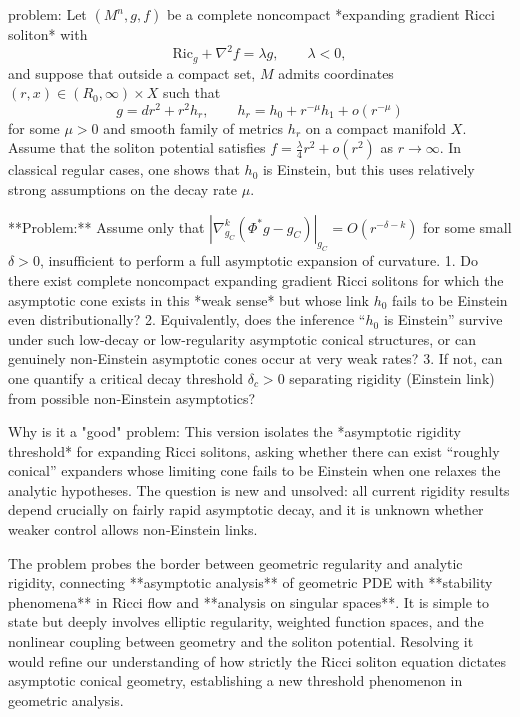 problem:  
Let \((M^n,g,f)\) be a complete noncompact *expanding gradient Ricci soliton* with  
\[
\mathrm{Ric}_g + \nabla^2 f = \lambda g, \qquad \lambda < 0,
\]
and suppose that outside a compact set, \(M\) admits coordinates \((r,x)\in (R_0,\infty)\times X\) such that  
\[
g = dr^2 + r^2 h_r, \qquad h_r = h_0 + r^{-\mu} h_1 + o(r^{-\mu})
\]
for some \(\mu>0\) and smooth family of metrics \(h_r\) on a compact manifold \(X\).  Assume that the soliton potential satisfies \(f = \tfrac{\lambda}{4}r^2 + o(r^2)\) as \(r\to\infty\).  In classical regular cases, one shows that \(h_0\) is Einstein, but this uses relatively strong assumptions on the decay rate \(\mu\).  

**Problem:**  
Assume only that \(|\nabla_{g_C}^k(\Phi^*g - g_C)|_{g_C} = O(r^{-\delta-k})\) for some small \(\delta>0\), insufficient to perform a full asymptotic expansion of curvature.  
1. Do there exist complete noncompact expanding gradient Ricci solitons for which the asymptotic cone exists in this *weak sense* but whose link \(h_0\) fails to be Einstein even distributionally?  
2. Equivalently, does the inference “\(h_0\) is Einstein” survive under such low-decay or low-regularity asymptotic conical structures, or can genuinely non‑Einstein asymptotic cones occur at very weak rates?  
3. If not, can one quantify a critical decay threshold \(\delta_c>0\) separating rigidity (Einstein link) from possible non‑Einstein asymptotics?

Why is it a "good" problem:  
This version isolates the *asymptotic rigidity threshold* for expanding Ricci solitons, asking whether there can exist “roughly conical” expanders whose limiting cone fails to be Einstein when one relaxes the analytic hypotheses.  The question is new and unsolved: all current rigidity results depend crucially on fairly rapid asymptotic decay, and it is unknown whether weaker control allows non‑Einstein links.  

The problem probes the border between geometric regularity and analytic rigidity, connecting **asymptotic analysis** of geometric PDE with **stability phenomena** in Ricci flow and **analysis on singular spaces**.  It is simple to state but deeply involves elliptic regularity, weighted function spaces, and the nonlinear coupling between geometry and the soliton potential.  Resolving it would refine our understanding of how strictly the Ricci soliton equation dictates asymptotic conical geometry, establishing a new threshold phenomenon in geometric analysis.